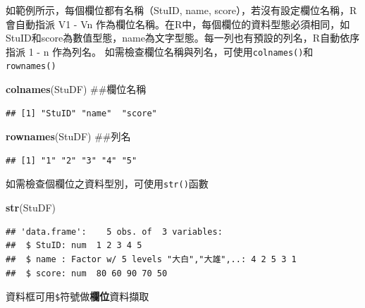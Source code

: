 \documentclass[]{book}
\newenvironment{Shaded}{\begin{snugshade}}{\end{snugshade}}
\newcommand{\KeywordTok}[1]{\textcolor[rgb]{0.13,0.29,0.53}{\textbf{{#1}}}}
\newcommand{\NormalTok}[1]{{#1}}
\theoremstyle{definition}
\theoremstyle{definition}
\theoremstyle{remark}
\begin{document}
如範例所示，每個欄位都有名稱（StuID, name,
score），若沒有設定欄位名稱，R會自動指派 V1 - Vn
作為欄位名稱。在R中，每個欄位的資料型態必須相同，如StuID和score為數值型態，name為文字型態。每一列也有預設的列名，R自動依序指派
1 - n 作為列名。
如需檢查欄位名稱與列名，可使用\texttt{colnames()}和\texttt{rownames()}

\begin{Shaded}
\begin{Highlighting}[]
\KeywordTok{colnames}\NormalTok{(StuDF) ##欄位名稱}
\end{Highlighting}
\end{Shaded}

\begin{verbatim}
## [1] "StuID" "name"  "score"
\end{verbatim}

\begin{Shaded}
\begin{Highlighting}[]
\KeywordTok{rownames}\NormalTok{(StuDF) ##列名}
\end{Highlighting}
\end{Shaded}

\begin{verbatim}
## [1] "1" "2" "3" "4" "5"
\end{verbatim}

如需檢查個欄位之資料型別，可使用\texttt{str()}函數

\begin{Shaded}
\begin{Highlighting}[]
\KeywordTok{str}\NormalTok{(StuDF) }
\end{Highlighting}
\end{Shaded}

\begin{verbatim}
## 'data.frame':    5 obs. of  3 variables:
##  $ StuID: num  1 2 3 4 5
##  $ name : Factor w/ 5 levels "大白","大雄",..: 4 2 5 3 1
##  $ score: num  80 60 90 70 50
\end{verbatim}

資料框可用\texttt{\$}符號做\textbf{欄位}資料擷取

\begin{Shaded}
\end{Shaded}
\end{document}
